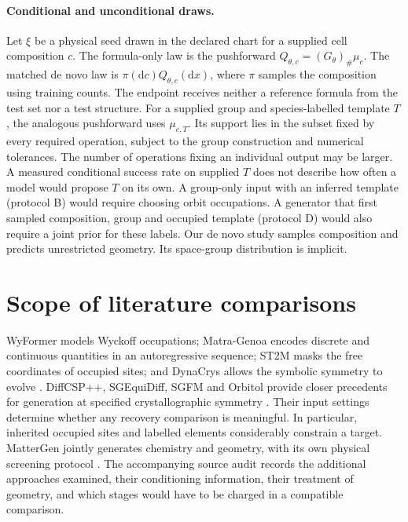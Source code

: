 \paragraph{Conditional and unconditional draws.}
Let $\xi$ be a physical seed drawn in the declared chart for a supplied cell composition $c$. The formula-only law is the pushforward $Q_{\theta,c}=(G_\theta)_\#\mu_c$. The matched de novo law is $\pi(\mathrm dc)Q_{\theta,c}(\mathrm dx)$, where $\pi$ samples the composition using training counts. The endpoint receives neither a reference formula from the test set nor a test structure. For a supplied group and species-labelled template $T$, the analogous pushforward uses $\mu_{c,T}$. Its support lies in the subset fixed by every required operation, subject to the group construction and numerical tolerances. The number of operations fixing an individual output may be larger. A measured conditional success rate on supplied $T$ does not describe how often a model would propose $T$ on its own. A group-only input with an inferred template (protocol B) would require choosing orbit occupations. A generator that first sampled composition, group and occupied template (protocol D) would also require a joint prior for these labels. Our de novo study samples composition and predicts unrestricted geometry. Its space-group distribution is implicit.

\section{Scope of literature comparisons}
WyFormer models Wyckoff occupations; Matra-Genoa encodes discrete and continuous quantities in an autoregressive sequence; ST2M masks the free coordinates of occupied sites; and DynaCrys allows the symbolic symmetry to evolve \cite{wyformer,matra,st2m,dynacrys}. DiffCSP++, SGEquiDiff, SGFM and Orbitol provide closer precedents for generation at specified crystallographic symmetry \cite{diffcspplus,sgequi,sgfm,orbitol}. Their input settings determine whether any recovery comparison is meaningful. In particular, inherited occupied sites and labelled elements considerably constrain a target. MatterGen jointly generates chemistry and geometry, with its own physical screening protocol \cite{mattergen}. The accompanying source audit records the additional approaches examined, their conditioning information, their treatment of geometry, and which stages would have to be charged in a compatible comparison.

